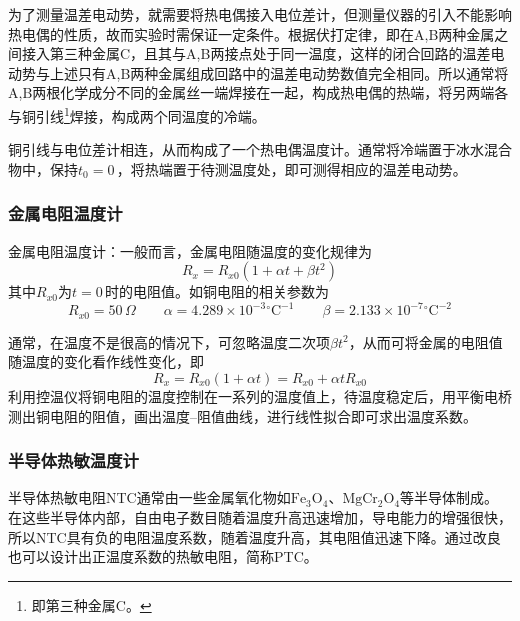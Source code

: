 \documentclass[UTF8]{article}
\theoremstyle{MyLineTheoremStyle} %
\theoremstyle{MyBlockTheoremStyle} %
\theoremstyle{MySubsubsectionStyle} %
\begin{document}
为了测量温差电动势，就需要将热电偶接入电位差计，但测量仪器的引入不能影响热电偶的性质，故而实验时需保证一定条件。根据伏打定律，即在A,B两种金属之间接入第三种金属C，且其与A,B两接点处于同一温度，这样的闭合回路的温差电动势与上述只有A,B两种金属组成回路中的温差电动势数值完全相同。所以通常将A,B两根化学成分不同的金属丝一端焊接在一起，构成热电偶的热端，将另两端各与铜引线\footnote{即第三种金属C。}焊接，构成两个同温度的冷端。

铜引线与电位差计相连，从而构成了一个热电偶温度计。通常将冷端置于冰水混合物中，保持$ t_0=0 $\,\textcelsius，将热端置于待测温度处，即可测得相应的温差电动势。%


\subsubsection{金属电阻温度计}


金属电阻温度计：一般而言，金属电阻随温度的变化规律为
\begin{equation}
R_x=R_{x0}(1+\alpha t+\beta t^2)
\end{equation}
其中$ R_{x0} $为$ t=0 $\,\textcelsius 时的电阻值。如铜电阻的相关参数为
\begin{equation}
R_{x0}=50\,\Omega\qquad \alpha=4.289\times10^{-3}\mathrm{^\circ C}^{-1}\qquad \beta=2.133\times10^{-7}\mathrm{^\circ C}^{-2}
\end{equation}


通常，在温度不是很高的情况下，可忽略温度二次项$ \beta t^2 $，从而可将金属的电阻值随温度的变化看作线性变化，即
\begin{equation}
R_x=R_{x0}(1+\alpha t)=R_{x0}+\alpha tR_{x0}
\end{equation}
利用控温仪将铜电阻的温度控制在一系列的温度值上，待温度稳定后，用平衡电桥测出铜电阻的阻值，画出温度--阻值曲线，进行线性拟合即可求出温度系数。

\subsubsection{半导体热敏温度计}
半导体热敏电阻NTC通常由一些金属氧化物如$ \mathrm{Fe_3O_4} $、$ \mathrm{MgCr_2O_4} $等半导体制成。在这些半导体内部，自由电子数目随着温度升高迅速增加，导电能力的增强很快，所以NTC具有负的电阻温度系数，随着温度升高，其电阻值迅速下降。通过改良也可以设计出正温度系数的热敏电阻，简称PTC。
\end{document}
